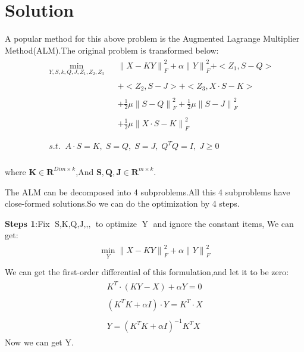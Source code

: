 \documentclass{article}
\begin{document}
\section{Solution}
A popular method for this above problem is the Augmented Lagrange Multiplier Method(ALM).The original problem is transformed below\;:
\begin{eqnarray}
&& \begin{array}{lll}
\mathop{\min}\limits_{Y,S,k,Q,J,Z_1,Z_2,Z_3 } && {\parallel X - KY\parallel}_F^2  + \alpha{\parallel Y\parallel}_F^2 + <Z_1,S-Q> \\\\ && + <Z_2,S-J> + <Z_3,X\cdot S-K> \\\\ && + \frac{1}{2}\mu{\parallel S - Q\parallel}_F^2 +\frac{1}{2}\mu{\parallel S - J\parallel}_F^2 \\\\ && + \frac{1}{2}\mu{\parallel X\cdot S - K\parallel}_F^2
\end{array}\\ \nonumber \\
&& \begin{array}{lll}
s.t. \;\; A\cdot S =K , \; S = Q , \; S = J , \; Q^TQ = I , \; J \geq 0 \nonumber
\end{array}
\end{eqnarray}\\
where $\mathbf{K} \in \mathbf{R}^{Dim \times k}$,And $\mathbf{S,Q,J} \in \mathbf{R}^{m \times k}$.


The ALM can be decomposed into 4 subproblems.All this 4 subproblems have close-formed solutions.So we can do the optimization by 4 steps.\\

\begin{flushleft}
\textbf{Steps 1}:\;\;Fix $\mathop{S,K,Q,J,Z_1,Z_2,Z_3}$ to optimize $\mathop{Y}$ and ignore the constant items, We can get:
\begin{eqnarray}
\begin{array}{l}
    \mathop{\min}\limits_{Y} {\parallel X - KY\parallel}_F^2 + \alpha{\parallel Y\parallel}_F^2\\
\end{array}
\end{eqnarray}
We can get the first-order differential of this formulation,and let it to be zero:
\begin{eqnarray}
\begin{array}{lll}
    K^T\cdot (KY-X) +\alpha Y = 0 \nonumber \\\\
    (K^TK +\alpha I)\cdot Y = K^T\cdot X \nonumber \\\\
    Y = (K^TK+\alpha I)^{-1}K^TX \nonumber
\end{array}
\end{eqnarray}
Now we can get Y.\\
\end{flushleft}
\end{document}
